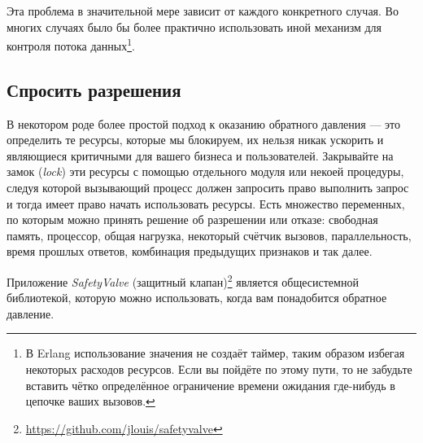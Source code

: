 Эта проблема в значительной мере зависит от каждого конкретного случая. Во многих случаях было бы более практично использовать иной механизм для контроля потока данных\footnote{В Erlang использование значения  не создаёт таймер, таким образом избегая некоторых расходов ресурсов. Если вы пойдёте по этому пути, то не забудьте вставить чётко определённое ограничение времени ожидания где-нибудь в цепочке ваших вызовов.}.


\subsection{Спросить разрешения}

В некотором роде более простой подход к оказанию обратного давления --- это определить те ресурсы, которые мы блокируем, их нельзя никак ускорить и являющиеся критичными для вашего бизнеса и пользователей. Закрывайте на замок (\emph{lock}) эти ресурсы с помощью отдельного модуля или некоей процедуры, следуя которой вызывающий процесс должен запросить право выполнить запрос и тогда имеет право начать использовать ресурсы. Есть множество переменных, по которым можно принять решение об разрешении или отказе: свободная память, процессор, общая нагрузка, некоторый счётчик вызовов, параллельность, время прошлых ответов, комбинация предыдущих признаков и так далее.

Приложение \emph{SafetyValve} (защитный клапан)\footnote{\href{https://github.com/jlouis/safetyvalve}{https://github.com/jlouis/safetyvalve}} является общесистемной библиотекой, которую можно использовать, когда вам понадобится обратное давление.


